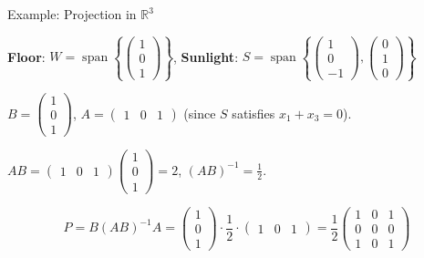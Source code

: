 \documentclass[10pt]{beamer}
\theoremstyle{definition}
\newcommand{\x}[1]{\alert{\textbf{#1}}}
\begin{document}
\begin{frame}{Example: Projection in $\mathbb{R}^3$}

\x{Floor}: $W = \operatorname{span}\left\{\begin{pmatrix} 1\\0\\1 \end{pmatrix}\right\}$, \quad \x{Sunlight}: $S = \operatorname{span}\left\{\begin{pmatrix} 1\\0\\-1 \end{pmatrix}, \begin{pmatrix} 0\\1\\0 \end{pmatrix}\right\}$

\vspace{0.3em}

$B = \begin{pmatrix} 1\\0\\1 \end{pmatrix}$, \; $A = \begin{pmatrix} 1 & 0 & 1 \end{pmatrix}$ \; (since $S$ satisfies $x_1 + x_3 = 0$).

\vspace{0.3em}

$AB = \begin{pmatrix} 1 & 0 & 1 \end{pmatrix}\begin{pmatrix} 1\\0\\1 \end{pmatrix} = 2$, \quad $(AB)^{-1} = \frac{1}{2}$.

\vspace{0.3em}

$$P = B(AB)^{-1}A = \begin{pmatrix} 1\\0\\1 \end{pmatrix} \cdot \frac{1}{2} \cdot \begin{pmatrix} 1 & 0 & 1 \end{pmatrix} = \frac{1}{2}\begin{pmatrix} 1 & 0 & 1 \\ 0 & 0 & 0 \\ 1 & 0 & 1 \end{pmatrix}$$

\end{frame}
\end{document}

